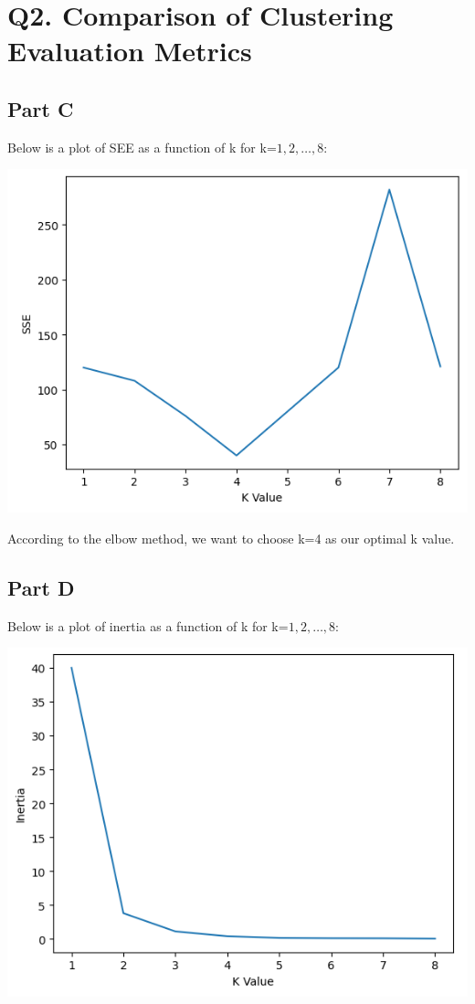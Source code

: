 \documentclass{article}
\begin{document}
\section*{Q2. Comparison of Clustering Evaluation Metrics}

\subsection*{Part C}
Below is a plot of SEE as a function of k for k=$1,2,\dots,8$:

\includegraphics[width=\linewidth]{Images/Screenshot 2024-03-17 164753.png}

According to the elbow method, we want to choose k=4 as our optimal k value.

\subsection*{Part D}
Below is a plot of inertia as a function of k for k=$1,2,\dots,8$:

\includegraphics[width=\linewidth]{Images/Screenshot 2024-03-17 165102.png}
\end{document}
